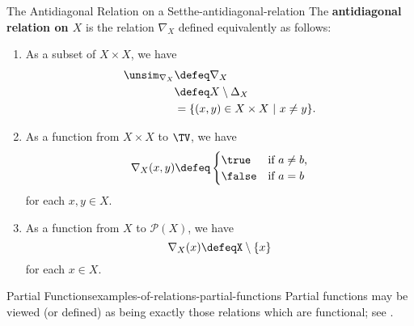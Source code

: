 \begin{example}{The Antidiagonal Relation on a Set}{the-antidiagonal-relation}%
    The \textbf{antidiagonal relation on $X$} is the relation $\nabla_{X}$ defined equivalently as follows:%
    \begin{enumerate}
        \item\label{the-antidiagonal-relation-1}As a subset of $X\times X$, we have
            \begin{align*}
                \unsim_{\nabla_{X}} &\defeq \nabla_{X}\\%
                                    &\defeq X\setminus\Delta_{X}\\
                                    &=      \{(x,y)\in X\times X\ |\ x\neq y\}.%
            \end{align*}
        \item\label{the-antidiagonal-relation-2}As a function from $X\times X$ to $\TV$, we have
            \[
                \nabla_{X}(x,y)
                \defeq
                \begin{cases}
                    \true  &\text{if $a\neq b$,}\\
                    \false &\text{if $a=b$}
                \end{cases}
            \]%
            for each $x,y\in X$.
        \item\label{the-antidiagonal-relation-3}As a function from $X$ to $\mathcal{P}(X)$, we have
            \[%
                \nabla_{X}(x)%
                \defeq%
                X\setminus\{x\}%
            \]%
            for each $x\in X$.
    \end{enumerate}
\end{example}
\begin{example}{Partial Functions}{examples-of-relations-partial-functions}%
    Partial functions may be viewed (or defined) as being exactly those relations which are functional; see .
\end{example}
